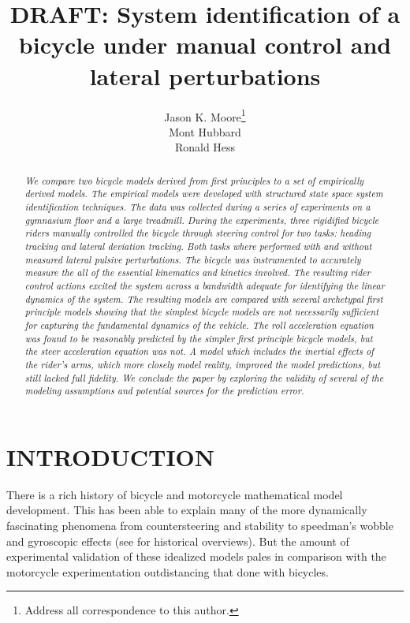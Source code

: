 \documentclass[twocolumn,10pt]{asme2e}
\title{DRAFT: System identification of a bicycle under manual control and
lateral perturbations}
\author{Jason K. Moore\thanks{Address all correspondence to this author.}\\
        {\tensfb Mont Hubbard}\\
				{\tensfb Ronald Hess}
    \affiliation{
    Department of Mechanical and Aerospace Engineering\\
    University of California\\
    Davis, California 95616\\
		Email: {jkmoor@ucdavis.edu, mhubbard@ucdavis.edu, rahess@ucdavis.edu}
    }
}
\begin{document}

\maketitle

\begin{abstract}
	\textit{We compare two bicycle models derived from first principles to a set
	of empirically derived models. The empirical models were developed with
	structured state space system identification techniques. The data was
	collected during a series of experiments on a gymnasium floor and a large
	treadmill. During the experiments, three rigidified bicycle riders manually
	controlled the bicycle through steering control for two tasks: heading
	tracking and lateral deviation tracking. Both tasks where performed with and
	without measured lateral pulsive perturbations. The bicycle was instrumented
	to accurately measure the all of the essential kinematics and kinetics
	involved. The resulting rider control actions excited the system across a
	bandwidth adequate for identifying the linear dynamics of the system. The
	resulting models are compared with several archetypal first principle models
	showing that the simplest bicycle models are not necessarily sufficient for
	capturing the fundamental dynamics of the vehicle. The roll acceleration
	equation was found to be reasonably predicted by the simpler first principle
	bicycle models, but the steer acceleration equation was not. A model which
	includes the inertial effects of the rider’s arms, which more closely model
	reality, improved the model predictions, but still lacked full fidelity. We
	conclude the paper by exploring the validity of several of the modeling
	assumptions and potential sources for the prediction error.}
\end{abstract}
%
\section*{INTRODUCTION}
There is a rich history of bicycle and motorcycle mathematical model
development. This has been able to explain many of the more dynamically
fascinating phenomena from countersteering and stability to speedman's wobble
and gyroscopic effects (see \cite{Limebeer2006, Meijaard2007} for historical
overviews). But the amount of experimental validation of these idealized models
pales in comparison with the motorcycle experimentation outdistancing
that done with bicycles.
\end{document}
